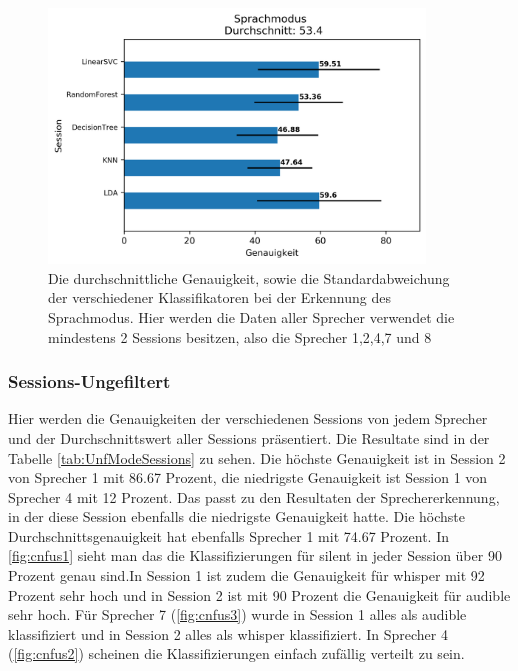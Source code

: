 \begin{figure}[H]
  \centering
  \includegraphics[width=100mm ,scale=0.6]{modeResultsSessionUnfiltered.png}
  \caption{Die durchschnittliche Genauigkeit, sowie die Standardabweichung der verschiedener Klassifikatoren bei der Erkennung des Sprachmodus. Hier werden die Daten aller Sprecher verwendet die mindestens 2 Sessions besitzen, also die Sprecher 1,2,4,7 und 8}
  \label{fig:mode1}
\end{figure}


\subsubsection{Sessions-Ungefiltert}

Hier werden die Genauigkeiten der verschiedenen Sessions von jedem Sprecher und der Durchschnittswert aller Sessions präsentiert. Die Resultate sind in der Tabelle \ref{tab:UnfModeSessions} zu sehen. Die höchste Genauigkeit ist in Session 2 von Sprecher 1 mit 86.67 Prozent, die niedrigste Genauigkeit ist Session 1 von Sprecher 4 mit 12 Prozent. Das passt zu den Resultaten der Sprechererkennung, in der diese Session ebenfalls die niedrigste Genauigkeit hatte.
Die höchste Durchschnittsgenauigkeit hat ebenfalls Sprecher 1 mit 74.67 Prozent. In \ref{fig:cnfus1} sieht man das die Klassifizierungen für silent in jeder Session über 90 Prozent genau sind.In Session 1 ist zudem die Genauigkeit für whisper mit 92 Prozent sehr hoch und in Session 2 ist mit 90 Prozent die Genauigkeit für audible sehr hoch.
Für Sprecher 7 (\ref{fig:cnfus3}) wurde in Session 1 alles als audible klassifiziert und in Session 2 alles als whisper klassifiziert. In Sprecher 4 (\ref{fig:cnfus2}) scheinen die Klassifizierungen einfach zufällig verteilt zu sein.


